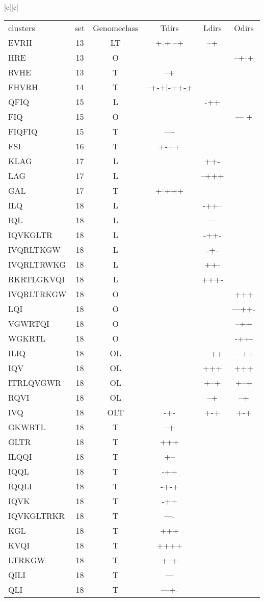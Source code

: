 \documentclass[table,
12pt, %
a4paper, %
oneside, %
headinclude,footinclude, %
BCOR5mm, %
]{scrartcl}
\begin{document}
\begin{table}[htbp]
\begin{adjustbox}{totalheight=\textheight,center}
\begin{tabular}{|c||c|}
\begin{tabular}{l ccccc}
clusters&set&Genomeclass&Tdirs&Ldirs&Odirs\\
\rowcolor{shadecolor}
EVRH&13&LT&+-+|--+&--+&\\
HRE&13&O&&&--+-+\\
RVHE&13&T&--+&&\\
\rowcolor{lightgray}
FHVRH&14&T&--+-+|-++-+&&\\
\rowcolor{shadecolor}
QFIQ&15&L&&-++&\\
FIQ&15&O&&&----+\\
FIQFIQ&15&T&----&&\\
\rowcolor{lightgray}
FSI&16&T&+-++&&\\
\rowcolor{shadecolor}
KLAG&17&L&&++-&\\
LAG&17&L&&--+++&\\
GAL&17&T&+-+++&&\\
\rowcolor{lightgray}
ILQ&18&L&&-++--&\\
IQL&18&L&&---&\\
IQVKGLTR&18&L&&-++-&\\
IVQRLTKGW&18&L&&-+-&\\
IVQRLTRWKG&18&L&&++-&\\
RKRTLGKVQI&18&L&&+++-&\\
IVQRLTRKGW&18&O&&&+++\\
LQI&18&O&&&---++-\\
VGWRTQI&18&O&&&--++\\
WGKRTL&18&O&&&-++-\\
ILIQ&18&OL&&---++&---++\\
IQV&18&OL&&+++&+++\\
ITRLQVGWR&18&OL&&+--+&+--+\\
RQVI&18&OL&&--+&--+\\
IVQ&18&OLT&-+-&+-+&+-+\\
GKWRTL&18&T&--+&&\\
GLTR&18&T&+++&&\\
ILQQI&18&T&+--&&\\
IQQL&18&T&-++&&\\
IQQLI&18&T&-+-+&&\\
IQVK&18&T&-++&&\\
IQVKGLTRKR&18&T&----&&\\
KGL&18&T&+++&&\\
KVQI&18&T&++++&&\\
LTRKGW&18&T&+--+&&\\
QILI&18&T&---&&\\
QLI&18&T&---+-&&\\

\end{tabular}
\end{tabular}
\end{adjustbox}
\end{table}
\end{document}
